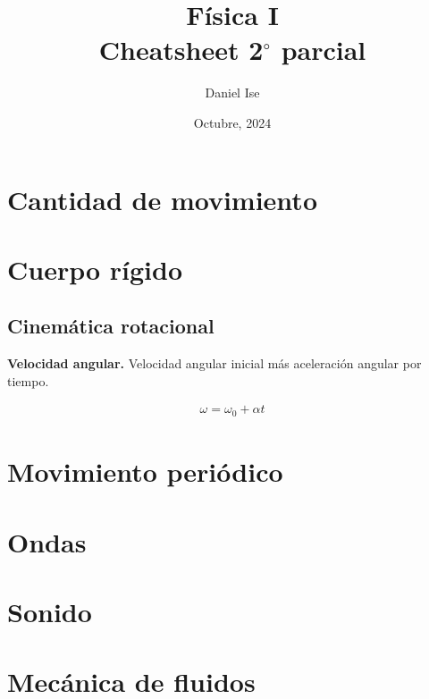 \documentclass[12pt]{article}
\title{Física I\\Cheatsheet 2\(^{\circ}\) parcial}
\author{Daniel Ise}
\date{Octubre, 2024}
\begin{document}
\maketitle

\tableofcontents

\pagebreak

\section{Cantidad de movimiento}

\section{Cuerpo rígido}

\subsection{Cinemática rotacional}

\textbf{Velocidad angular.} Velocidad angular inicial
más aceleración angular por tiempo.

\begin{align}
    \omega = \omega_{0} + \alpha t
\end{align}

\section{Movimiento periódico}

\section{Ondas}

\section{Sonido}

\section{Mecánica de fluidos}
\end{document}
